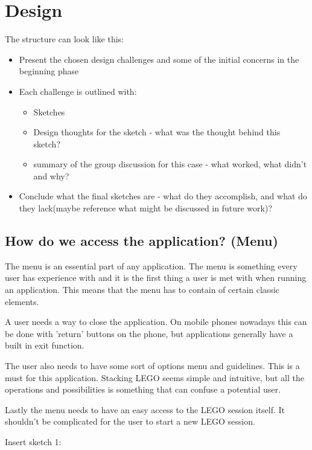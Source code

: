 
\section{Design}
The structure can look like this:
\begin{itemize}
	\item Present the chosen design challenges and some of the initial concerns in the beginning phase
	\item Each challenge is outlined with:
		\begin{itemize}
			\item Sketches
			\item Design thoughts for the sketch - what was the thought behind this sketch?
			\item summary of the group discussion for this case - what worked, what didn't and why?
		\end{itemize}
	\item Conclude what the final sketches are - what do they accomplish, and what do they lack(maybe reference what might be discussed in future work)?
\end{itemize}

\subsection{How do we access the application? (Menu)}
The menu is an essential part of any application. The menu is something every user has experience with and it is the first thing a user is met with when running an application. This means that the menu has to contain of certain classic elements.\par A user needs a way to close the application. On mobile phones nowadays this can be done with 'return' buttons on the phone, but applications generally have a built in exit function.\par
The user also needs to have some sort of options menu and guidelines. This is a must for this application. Stacking LEGO seems simple and intuitive, but all the operations and possibilities is something that can confuse a potential user. \par
Lastly the menu needs to have an easy access to the LEGO session itself. It shouldn't be complicated for the user to start a new LEGO session.
\begin{center}
	Insert sketch 1:
\end{center}


